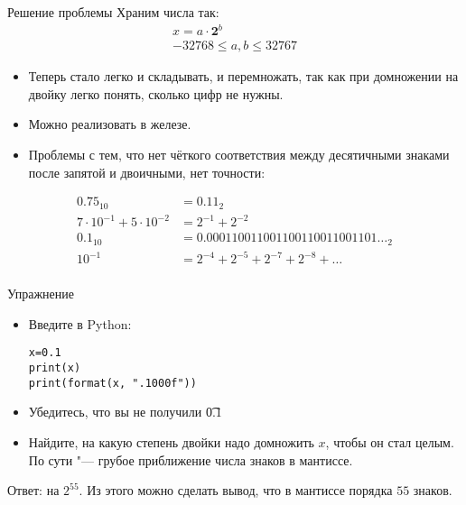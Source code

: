 \begin{frame}{Решение проблемы}
	Храним числа так:
	\begin{gather*}
		x = a \cdot \textbf{2}^b \\
		-32768 \le a, b \le 32767
	\end{gather*}
	\begin{itemize}
		\item Теперь стало легко и складывать, и перемножать, так как при домножении на двойку легко понять, сколько цифр не нужны.
		\item Можно реализовать в железе.
		\item
			Проблемы с тем, что нет чёткого соответствия между десятичными знаками после запятой и двоичными,
			нет точности:
	\end{itemize}
	\begin{align*}
		0.75_{10} &= {0.11}_{2} \\
		7 \cdot 10^{-1} + 5 \cdot 10^{-2} &= 2^{-1} + 2^{-2} \\
		0.1_{10} &= {0.000110011001100110011001101\dots}_{2} \\
		10^{-1} &= 2^{-4} + 2^{-5} + 2^{-7} + 2^{-8} + \dots \\
	\end{align*}
\end{frame}

\begin{frame}[fragile]{Упражнение}
	\begin{itemize}
		\item
			Введите в Python:
\begin{verbatim}
x=0.1
print(x)
print(format(x, ".1000f"))
\end{verbatim}
		\item
			Убедитесь, что вы не получили \t{0.1}
		\item
			Найдите, на какую степень двойки надо домножить $x$, чтобы он стал целым.
			По сути "--- грубое приближение числа знаков в мантиссе.
	\end{itemize}
	\pause
	Ответ: на $2^{55}$.
	Из этого можно сделать вывод, что в мантиссе порядка $55$ знаков.
\end{frame}
